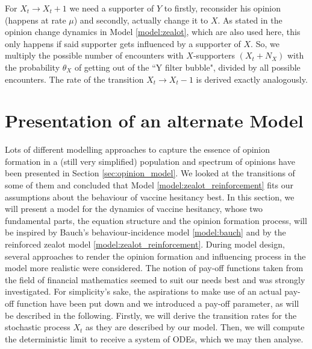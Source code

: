 \documentclass[12pt,a4paper,twoside]{article}
\begin{document}
For $X_t \rightarrow X_t + 1$ we need a supporter of $Y$ to firstly, reconsider his opinion (happens at rate $\mu$) and secondly, actually change it to $X$. As stated in the opinion change dynamics in Model \ref{model:zealot}, which are also used here, this only happens if said supporter gets influenced by a supporter of $X$. So, we multiply the possible number of encounters with $X$-supporters $(X_t + N_X)$ with the probability $\theta_X$ of getting out of the ``Y filter bubble", divided by all possible encounters. The rate of the transition $X_t \rightarrow X_t - 1$ is derived exactly analogously.\newline

\section{Presentation of an alternate Model}\label{sec:my_model}
Lots of different modelling approaches to capture the essence of opinion formation in a (still very simplified) population and spectrum of opinions have been presented in Section \ref{sec:opinion_model}. We looked at the transitions of some of them and concluded that Model \ref{model:zealot_reinforcement} fits our assumptions about the behaviour of vaccine hesitancy best. In this section, we will present a model for the dynamics of vaccine hesitancy, whose two fundamental parts, the equation structure and the opinion formation process, will be inspired by Bauch's behaviour-incidence model \eqref{model:bauch} and by the reinforced zealot model \eqref{model:zealot_reinforcement}. During model design, several approaches to render the opinion formation and influencing process in the model more realistic were considered. The notion of pay-off functions taken from the field of financial mathematics seemed to suit our needs best and was strongly investigated. For simplicity's sake, the aspirations to make use of an actual pay-off function have been put down and we introduced a pay-off parameter, as will be described in the following. Firstly, we will derive the transition rates for the stochastic process $X_t$ as they are described by our model. Then, we will compute the deterministic limit to receive a system of \acp{ODE}, which we may then analyse.
\end{document}
